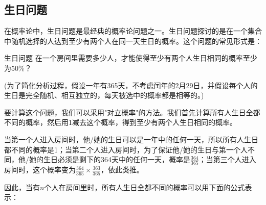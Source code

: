 
\begin{issues}
\issueDraft
\end{issues}

\subsection{生日问题}

在概率论中，生日问题是最经典的概率论问题之一。生日问题探讨的是在一个集合中随机选择的人达到至少有两个人在同一天生日的概率。这个问题的常见形式是：

\begin{example}{生日问题}
在一个房间里需要多少人，才能使得至少有两个人生日相同的概率至少为50\%？

(为了简化分析过程，假设一年有365天，不考虑闰年的2月29日，并假设每个人的生日是完全随机、相互独立的，每天被选中的概率都是相等的。)
\end{example}

要计算这个问题，我们可以采用"对立概率"的方法。我们首先计算所有人生日全都不同的概率，然后用1减去这个概率，得到至少有两个人生日相同的概率。

当第一个人进入房间时，他/她的生日可以是一年中的任何一天，所以所有人生日都不同的概率是1；当第二个人进入房间时，为了保证他/她的生日与第一个人不同，他/她的生日必须是剩下的364天中的任何一天，概率是$\frac{364}{365}$；当第三个人进入房间时，这个概率变为$\frac{364}{365} \times \frac{363}{365}$，依此类推。

因此，当有$n$个人在房间里时，所有人生日全都不同的概率可以用下面的公式表示：


